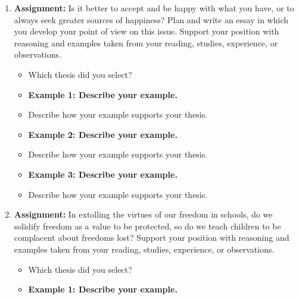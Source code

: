 \begin{enumerate}

\item \large{\bf{Assignment:}} Is it better to accept and be happy with what you have, or to always seek greater sources of happiness? Plan and write an essay in which you develop your point of view on this issue. Support your position with reasoning and examples taken from your reading, studies, experience, or observations.

\begin{itemize}
\item Which thesis did you select? \hrulefill
\item \bf{Example 1:} Describe your example. \hrulefill
\noindent\makebox[\linewidth]{\rule{\paperwidth}{0.4pt}}

\item Describe how your example supports your thesis. \hrulefill
\noindent\makebox[\linewidth]{\rule{\paperwidth}{0.4pt}}

\item \bf{Example 2:} Describe your example. \hrulefill
\noindent\makebox[\linewidth]{\rule{\paperwidth}{0.4pt}}

\item Describe how your example supports your thesis. \hrulefill
\noindent\makebox[\linewidth]{\rule{\paperwidth}{0.4pt}}

\item \bf{Example 3:} Describe your example. \hrulefill
\noindent\makebox[\linewidth]{\rule{\paperwidth}{0.4pt}}

\item Describe how your example supports your thesis. \hrulefill
\noindent\makebox[\linewidth]{\rule{\paperwidth}{0.4pt}}

\end{itemize}

\item\large{\bf{Assignment:}} In extolling the virtues of our freedom in schools, do we solidify freedom as a value to be protected, so do we teach children to be complacent about freedoms lost? Support your position with reasoning and examples taken from your reading, studies, experience, or observations.

\begin{itemize}
\item Which thesis did you select? \hrulefill
\item \bf{Example 1:} Describe your example. \hrulefill
\noindent\makebox[\linewidth]{\rule{\paperwidth}{0.4pt}}


\end{itemize}
\end{enumerate}
